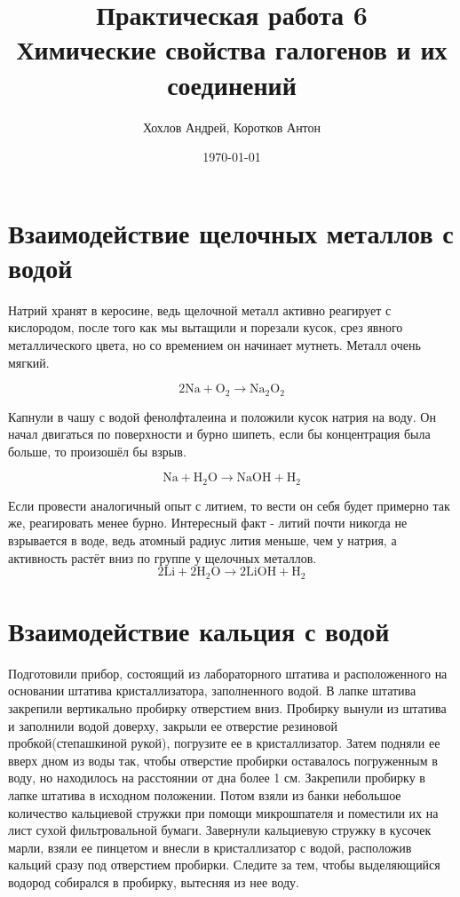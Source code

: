 \documentclass[a4paper,12pt]{article}
\author{Хохлов Андрей, Коротков Антон}
\title{Практическая работа 6 \\
	\textbf{Химические свойства галогенов и их соединений}}
\date{\today}
\begin{document}
	
	{\Large \maketitle}
\section{Взаимодействие щелочных металлов с водой}
Натрий хранят в керосине, ведь щелочной металл активно реагирует с кислородом, после того как мы вытащили и порезали кусок, срез явного металлического цвета, но со времением он начинает мутнеть. Металл очень мягкий.
  
\begin{equation} 
\mathrm{2Na + O_2 \longrightarrow Na_2O_2  } 
\end{equation}

Капнули в чашу с водой фенолфталеина и положили кусок натрия на воду. Он начал двигаться по поверхности и бурно шипеть, если бы концентрация была больше, то произошёл бы взрыв.

\begin{equation} 
\mathrm{Na + H_2O \longrightarrow NaOH + H_2 } 
\end{equation}

Если провести аналогичный опыт с литием,  то вести он себя будет примерно так же, реагировать менее бурно. Интересный факт - литий почти никогда не взрывается в воде, ведь атомный радиус лития меньше, чем у натрия, а активность растёт вниз по группе у щелочных металлов.
\begin{equation} 
\mathrm{2Li + 2H_2O \longrightarrow 2LiOH + H_2 } 
\end{equation}
\section{Взаимодействие кальция с водой}
Подготовили прибор, состоящий из лабораторного штатива и расположенного на основании
штатива кристаллизатора, заполненного водой. В лапке штатива закрепили вертикально пробирку
отверстием вниз. Пробирку вынули из штатива и заполнили водой
доверху, закрыли ее отверстие резиновой пробкой(степашкиной рукой), погрузите ее в кристаллизатор. Затем
подняли ее вверх дном из воды так, чтобы отверстие пробирки оставалось погруженным в воду,
но находилось на расстоянии от дна более 1 см. Закрепили пробирку в лапке штатива в исходном
положении. 
Потом взяли из банки небольшое количество кальциевой стружки при помощи
микрошпателя и поместили их на лист сухой фильтровальной бумаги. Завернули кальциевую
стружку в кусочек марли, взяли ее пинцетом и внесли в кристаллизатор с водой, расположив
кальций сразу под отверстием пробирки.  Следите за тем, чтобы выделяющийся водород собирался в пробирку, вытесняя из нее воду.
\end{document}
